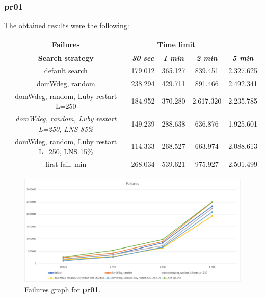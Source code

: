 \subsubsection{pr01}
\label{subsubsec:pr01}
The obtained results were the following:
{
\renewcommand{\arraystretch}{2}
\begin{longtable}[h]{| c | c | c | c | c |}
    \hline
    \textbf{Failures} & \multicolumn{3}{c}{Time limit} & \\
    \hline
    \textbf{Search strategy} & \textbf{\textit{30 sec}} & \textbf{\textit{1 min}} & \textbf{\textit{2 min}} & \textbf{\textit{5 min}} \\
    \hline
    \endhead
    default search                                         & 179.012 & 365.127 &  839.451 & 2.327.625 \\
    \hline
    domWdeg, random                                        & 238.294 & 429.711 &  891.466 & 2.492.341 \\
    \hline
    domWdeg, random, Luby restart L=250                    & 184.952 & 370.280 & 2.617.320 & 2.235.785 \\
    \hline
    \textit{domWdeg, random, Luby restart L=250, LNS 85\%} & 149.239 & 288.638 &  636.876 & 1.925.601 \\
    \hline
    domWdeg, random, Luby restart L=250, LNS 15\%          & 114.333 & 268.527 &  663.974 & 2.088.613 \\
    \hline
    first fail, min                                        & 268.034 & 539.621 &  975.927 & 2.501.499 \\
    \hline
\end{longtable}
}
\begin{figure}[H]
    \centering
    \includegraphics[width=0.8\columnwidth]{../graphs/pr01-failures.png}
    \caption{Failures graph for \textbf{pr01}.}
\end{figure}

